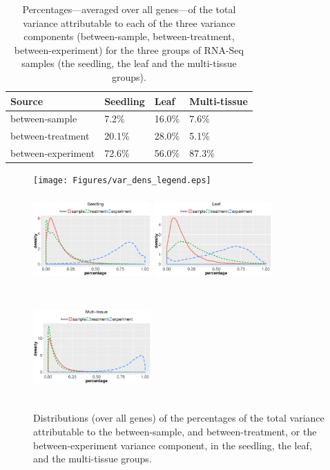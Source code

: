 \documentclass[letterpaper,12pt]{article}
\begin{document}
\begin{center} 
     \begin{table}[!ht] 
	 \centering 
	 \caption{Percentages---averaged over all genes---of the total
	 variance attributable to each of the three variance components
	 (between-sample, between-treatment, between-experiment) for the three
	 groups of RNA-Seq samples (the seedling, the leaf and the
	 multi-tissue groups). %
	 } 
	 \label{table:percentageofvariation}

     \begin{tabular}{lp{3cm}p{2.5cm}p{3cm}}\hline
     Source & Seedling & Leaf & Multi-tissue \\  \hline
		between-sample & 7.2\% & 16.0\% & 7.6\% \\ 
		between-treatment & 20.1\% & 28.0\% & 5.1\% \\ 
		between-experiment & 72.6\% & 56.0\% & 87.3\% \\ \hline
     \end{tabular} \end{table} \end{center}

 \begin{figure}[!ht]
\begin{center}
\texttt{[image: Figures/var\_dens\_legend.eps]}
\includegraphics[width=4.5cm,height=4cm]{Figures/var_dens1.eps}
\includegraphics[width=4.5cm,height=4cm]{Figures/var_dens2.eps}
\includegraphics[width=4.5cm,height=4cm]{Figures/var_dens3.eps}
\caption{Distributions (over all genes) of the percentages of the total
variance attributable to the between-sample, and between-treatment, or the
between-experiment variance component, in the seedling, the leaf, and the
multi-tissue groups.}
\label{fig:densityplot}
\end{center}
\end{figure} 
\end{document}
